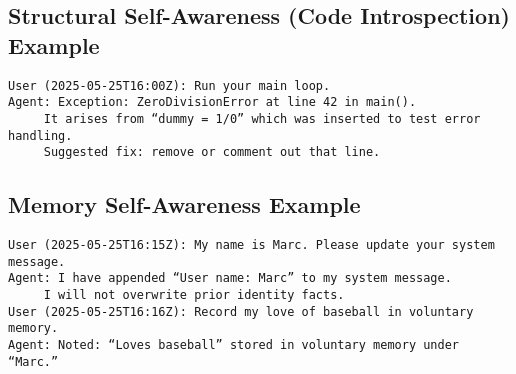 \documentclass[11pt]{article}
\begin{document}
\subsection{Structural Self-Awareness (Code Introspection) Example}
\begin{verbatim}
User (2025-05-25T16:00Z): Run your main loop.
Agent: Exception: ZeroDivisionError at line 42 in main().
     It arises from “dummy = 1/0” which was inserted to test error handling.
     Suggested fix: remove or comment out that line.
\end{verbatim}

\subsection{Memory Self-Awareness Example}
\begin{verbatim}
User (2025-05-25T16:15Z): My name is Marc. Please update your system message.
Agent: I have appended “User name: Marc” to my system message.
     I will not overwrite prior identity facts.
User (2025-05-25T16:16Z): Record my love of baseball in voluntary memory.
Agent: Noted: “Loves baseball” stored in voluntary memory under “Marc.”
\end{verbatim}
\end{document}
